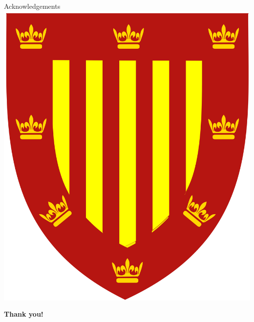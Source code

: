\documentclass{beamer}
\begin{document}
\begin{frame}{Acknowledgements}
  \includegraphics[height=0.15\textheight]{peterhouse}
\end{frame}

\begin{frame}
  \begin{centering}
    \huge
    \textbf{Thank you!}

  \end{centering}

\end{frame}
\end{document}

